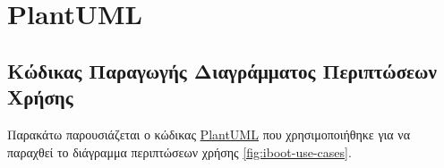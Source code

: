 \chapter{PlantUML}

\section{Κώδικας Παραγωγής Διαγράμματος Περιπτώσεων Χρήσης}
Παρακάτω παρουσιάζεται ο κώδικας \href{http://www.plantuml.com/plantuml/uml}{PlantUML} που χρησιμοποιήθηκε για να παραχθεί το διάγραμμα περιπτώσεων χρήσης \ref{fig:iboot-use-cases}.


